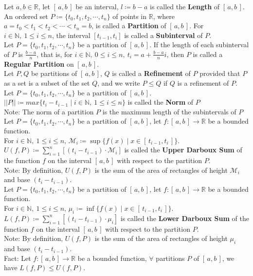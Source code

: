 \documentclass[11pt]{article}
\newcommand{\R}{\mathbb{R}}
\newcommand{\N}{\mathbb{N}}
\newcommand{\M}{\mathcal{M}}
\newcommand{\note}{\color{gray}Note: \color{black}}
\newcommand{\fact}{\color{gray}Fact: \color{black}}
\newcommand{\Intab}{[\,a,b\,]}
\begin{document}
		\noindent Let $a,b \in \R$, let $[\,a,b\,]$ be an interval, $l\coloneqq b-a$ is called the \textbf{Length} of $[\,a,b\,]$.\\
		
		\noindent An ordered set $P \coloneqq \{ t_0,t_1,t_2,\cdots ,t_n \}$ of points in $\R$, where $a=t_0<t_1<t_2<\cdots<t_n=b$, is called a \textbf{Partition} of $[\,a,b\,]$. For $i \in \N, \ 1\leq i \leq n$, the interval $[t_{i-1},t_i]$ is called a \textbf{Subinterval} of $P$. \\
		
		
		\noindent Let $P = \{ t_0,t_1,t_2,\cdots ,t_n \}$ be a partition of $[\,a,b\,]$. If the length of each subinterval of $P$ is $\frac{b-a}{n}$, that is, for $i \in \N, \ 0\leq i \leq n, \ t_i=a+\frac{b-a}{n}i$, then $P$ is called a \textbf{Regular Partition} on $[\,a,b\,]$.\\		
		
		\noindent Let $P,Q$ be partitions of $[\,a,b\,]$, $Q$ is called a \textbf{Refinement} of $P$ provided that $P$ as a set is a subset of the set $Q$, and we write $P \leq Q$ if $Q$ is a refinement of $P$.\\

		\noindent Let $P = \{ t_0,t_1,t_2,\cdots ,t_n \}$ be a partition of $[\,a,b\,]$.\\ $||P|| \coloneqq max\{t_i-t_{i-1} \mid i \in \N, \ 1\leq i \leq n\}$ is called the \textbf{Norm} of $P$\\
		\note The norm of a partition $P$ is the maximum length of the subintervals of $P$\\
		
		\noindent Let $P = \{ t_0,t_1,t_2,\cdots ,t_n \}$ be a partition of $[\,a,b\,]$, let $f:[\,a,b\,]\to \R$ be a bounded function.\\ For $i \in \N, \ 1\leq i \leq n$, $\M_i \coloneqq  \sup\{ f(x) \mid x \in [\, t_{i-1},t_i \,]\}$. $U(f,P)\coloneqq \sum_{i=1}^{n} [(t_i - t_{i-1}) \cdot \M_i]$ is called the \textbf{Upper Darboux Sum} of the function $f$ on the interval $[\,a,b\,]$ with respect to the partition $P$.\\
		\note By definition, $U(f,P)$ is the sum of the area of rectangles of height $\M_i$ and base $(t_i-t_{i-1})$.\\
		
		\noindent Let $P = \{ t_0,t_1,t_2,\cdots ,t_n \}$ be a partition of $[\,a,b\,]$, let $f:[\,a,b\,]\to \R$ be a bounded function.\\ For $i \in \N, \ 1\leq i \leq n$, $\mu_i \coloneqq  \inf \{ f(x) \mid x \in [\, t_{i-1},t_i \,]\}$. $L(f,P)\coloneqq \sum_{i=1}^{n} [(t_i - t_{i-1}) \cdot \mu_i]$ is called the \textbf{Lower Darboux Sum} of the function $f$ on the interval $[\,a,b\,]$ with respect to the partition $P$.\\
		\note By definition, $U(f,P)$ is the sum of the area of rectangles of height $\mu_i$ and base $(t_i-t_{i-1})$.\\
		\fact Let $f:[\,a,b\,]\to \R$ be a bounded function, $\forall$ partitions $P$ of $\Intab$, we have $L(f,P) \leq U(f,P)$.\\
		
\end{document}
